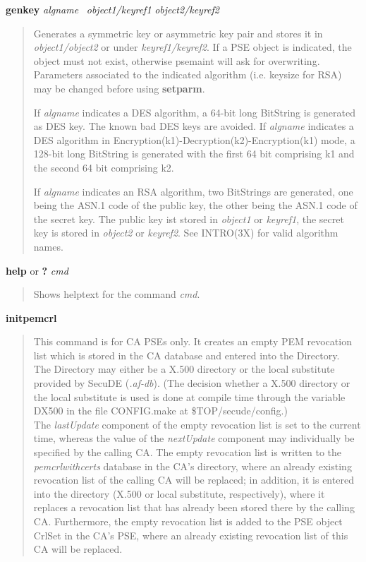 {\bf genkey} {\em algname}~ {\em object1/keyref1} {\em object2/keyref2} 
\begin{quote}
Generates a symmetric key or asymmetric key pair and stores it in {\em object1/object2} or 
under {\em keyref1/keyref2}. 
If a PSE object is indicated, the object must not exist, otherwise psemaint will ask for overwriting. 
Parameters associated to the indicated algorithm (i.e. keysize for RSA) may
be changed before using {\bf setparm}. 
 
If {\em algname} indicates a DES algorithm, a 64-bit long BitString is generated as DES key. The
known bad DES keys are avoided. If {\em algname} indicates a DES algorithm in 
Encryption(k1)-Decryption(k2)-Encryption(k1) mode, a 128-bit long BitString is generated with
the first 64 bit comprising k1 and the second 64 bit comprising k2.
 
If {\em algname} indicates an RSA algorithm, two BitStrings are generated, one being
the ASN.1 code of the public key, the other being the ASN.1 code of the secret key.
The public key ist stored in {\em object1} or {\em keyref1}, the secret key is stored in
{\em object2} or {\em keyref2}.
See INTRO(3X) for valid algorithm names.
\end{quote}

{\bf help} or {\bf ?} {\em cmd}
\begin{quote}
Shows helptext for the command {\em cmd}.
\end{quote}

{\bf initpemcrl} 
\begin{quote}
This command is for CA PSEs only.
It creates an empty PEM revocation list which is stored in the CA database and entered into the Directory. \\
The Directory may either be a X.500 directory or the local substitute provided by 
SecuDE ({\em .af-db}). (The decision whether a X.500 directory or the local substitute 
is used is done at compile time through the variable DX500 in the file CONFIG.make
at \$TOP/secude/config.) \\
The {\em lastUpdate} component of the empty revocation list is set to the current time, whereas the value 
of the {\em nextUpdate} component may individually be specified by the calling CA. The empty
revocation list is written to the {\em pemcrlwithcerts} database in the CA's directory, where an already
existing revocation list of the calling CA will be replaced; in addition, 
it is entered into the directory (X.500 or local substitute, respectively), where it replaces
a revocation list that has already been stored there by the calling CA. 
Furthermore, the empty revocation list is added to the PSE object CrlSet in the CA's PSE, where an
already existing revocation list of this CA will be replaced.
\end{quote}

